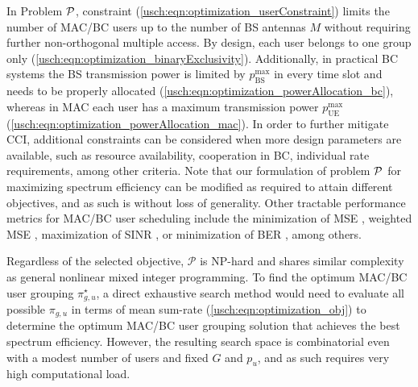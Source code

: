 In Problem ${\cal P}$, constraint (\ref{usch:eqn:optimization_userConstraint}) limits the number of MAC/BC users up to the number of BS antennas $M$ without requiring further non-orthogonal multiple access. By design, each user belongs to one group only (\ref{usch:eqn:optimization_binaryExclusivity}). Additionally, in practical BC systems the BS transmission power is limited by $p_{\mathrm{BS}}^{\mathrm{max}}$ in every time slot and needs to be properly allocated (\ref{usch:eqn:optimization_powerAllocation_bc}), whereas in MAC each user has a maximum transmission power $p_{\mathrm{UE}}^{\mathrm{max}}$ (\ref{usch:eqn:optimization_powerAllocation_mac}).
In order to further mitigate CCI, additional constraints can be considered when more design parameters are available, such as 
resource availability, cooperation in BC, individual rate requirements, among other criteria.
Note that our formulation of problem ${\cal P}$ for maximizing spectrum efficiency can be modified as required to attain different objectives, and as such is without loss of generality. Other tractable performance metrics for MAC/BC user scheduling include the minimization of MSE \cite{Mo09, Lee76}, weighted MSE \cite{Sampath01}, maximization of SINR \cite{Scaglione99}, or minimization of BER \cite{Palomar05},
among others. 

Regardless of the selected objective, $\mathcal{P}$ is NP-hard and shares similar complexity as general nonlinear mixed integer programming. 
To find the optimum MAC/BC user grouping $\pi_{g,u}^{\star}$, a direct exhaustive search method would need to evaluate all possible $\pi_{g,u}$ in terms of mean sum-rate (\ref{usch:eqn:optimization_obj}) to determine the optimum MAC/BC user grouping solution that achieves the 
best spectrum efficiency. However, the resulting search space is combinatorial even with a modest number of users and fixed $G$ and $p_u$, and as such requires very high computational load. 



